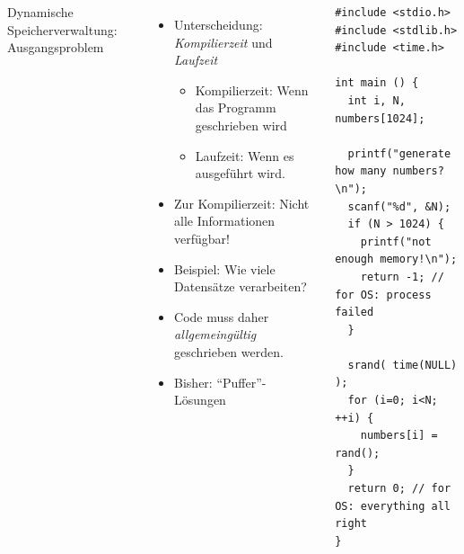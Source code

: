 
\begin{frame}[fragile]
%
\begin{columns}[T]
\begin{Large}
Dynamische Speicherverwaltung: Ausgangsproblem
\vspace{10pt}
\end{Large}
%
\begin{itemize}
\item Unterscheidung: \emph{Kompilierzeit} und \emph{Laufzeit}
	\begin{itemize}
	\item Kompilierzeit: Wenn das Programm geschrieben wird
	\item Laufzeit: Wenn es ausgeführt wird.
	\end{itemize}
\item Zur Kompilierzeit: Nicht alle Informationen verfügbar!
\item Beispiel: Wie viele Datensätze verarbeiten?
\item Code muss daher \emph{allgemeingültig} geschrieben werden.
\item Bisher: \enquote{Puffer}-Lösungen
\end{itemize}
%
\begin{codebox}[Beispiel: Liste von Zufallszahlen, height=7.7cm]
\begin{verbatim}
#include <stdio.h>
#include <stdlib.h>
#include <time.h>

int main () {
  int i, N, numbers[1024];
  
  printf("generate how many numbers?\n");
  scanf("%d", &N);
  if (N > 1024) {
    printf("not enough memory!\n");
    return -1; // for OS: process failed
  }
  
  srand( time(NULL) );
  for (i=0; i<N; ++i) {
    numbers[i] = rand();
  }
  return 0; // for OS: everything all right
}
\end{verbatim}
\end{codebox}
\end{columns}

%
\end{frame}


